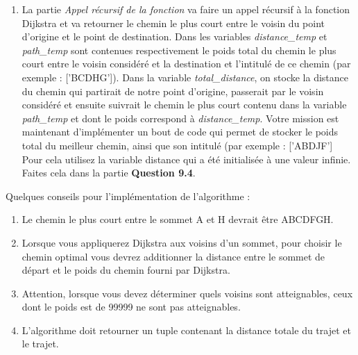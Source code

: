 \begin{Exercice}[15 minutes]
\begin{enumerate}
        \item La partie \textit{Appel récursif de la fonction} va faire un appel récursif à la fonction Dijkstra et va retourner le chemin le plus court entre le voisin du point d'origine et le point de destination. Dans les variables \textit{distance\_temp} et \textit{path\_temp} sont contenues respectivement le poids total du chemin le plus court entre le voisin considéré et la destination et l'intitulé de ce chemin (par exemple : ['BCDHG']). Dans la variable \textit{total\_distance}, on stocke la distance du chemin qui partirait de notre point d'origine, passerait par le voisin considéré et ensuite suivrait le chemin le plus court contenu dans la variable \textit{path\_temp} et dont le poids correspond à \textit{distance\_temp}. Votre mission est maintenant d'implémenter un bout de code qui permet de stocker le poids total du meilleur chemin, ainsi que son intitulé (par exemple : ['ABDJF'] Pour cela utilisez la variable distance qui a été initialisée à une valeur infinie. Faites cela dans la partie \textbf{Question 9.4}.
        
    \end{enumerate}
    \begin{conseil}
        Quelques conseils pour l'implémentation de l'algorithme :
        \begin{enumerate}
            \item Le chemin le plus court entre le sommet A et H devrait être ABCDFGH.
            \item Lorsque vous appliquerez Dijkstra aux voisins d'un sommet, pour choisir le chemin optimal vous devrez additionner la distance entre le sommet de départ et le poids du chemin fourni par Dijkstra.
            \item Attention, lorsque vous devez déterminer quels voisins sont atteignables, ceux dont le poids est de 99999 ne sont pas atteignables.
            \item L'algorithme doit retourner un tuple contenant la distance totale du trajet et le trajet.
        \end{enumerate}
    \end{conseil}
    \begin{solution}
        
    \end{solution}
\end{Exercice}


